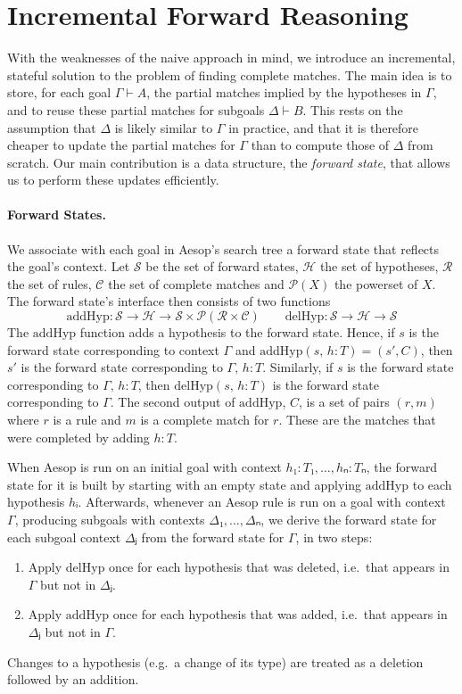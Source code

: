 \documentclass[runningheads,leqno]{llncs}
\newcommand{\para}[1]{\paragraph{\bfseries\upshape #1}}
\newcommand{\Rules}{\ensuremath{\mathcal{R}}}
\newcommand{\Hyps}{\ensuremath{\mathcal{H}}}
\newcommand{\States}{\ensuremath{\mathcal{S}}}
\newcommand{\CMatches}{\ensuremath{\mathcal{C}}}
\newcommand{\addHyp}{\ensuremath{\mathrm{addHyp}}}
\newcommand{\delHyp}{\ensuremath{\mathrm{delHyp}}}
\newcommand{\powerset}{\ensuremath{\mathcal{P}}}
\begin{document}
\section{Incremental Forward Reasoning}%
\label{sec:incremental}

With the weaknesses of the naive approach in mind, we introduce an incremental, stateful solution to the problem of finding complete matches.
The main idea is to store, for each goal $Γ ⊢ A$, the partial matches implied by the hypotheses in $Γ$, and to reuse these partial matches for subgoals $Δ ⊢ B$.
This rests on the assumption that $Δ$ is likely similar to $Γ$ in practice, and that it is therefore cheaper to update the partial matches for $Γ$ than to compute those of $Δ$ from scratch.
Our main contribution is a data structure, the \emph{forward state}, that allows us to perform these updates efficiently.

\para{Forward States.}
We associate with each goal in Aesop's search tree a forward state that reflects the goal's context.
Let $\States$ be the set of forward states, $\Hyps$ the set of hypotheses, $\Rules$ the set of rules, $\CMatches$ the set of complete matches and $\powerset(X)$ the powerset of $X$.
The forward state's interface then consists of two functions
\begin{equation*}
  \addHyp : \States → \Hyps → \States × \powerset(\Rules × \CMatches) \qquad \delHyp : \States → \Hyps → \States
\end{equation*}
The $\addHyp$ function adds a hypothesis to the forward state.
Hence, if $s$ is the forward state corresponding to context $Γ$ and $\addHyp(s,\, h : T) = (s', C)$, then $s'$ is the forward state corresponding to $Γ,\, h : T$.
Similarly, if $s$ is the forward state corresponding to $Γ,\, h : T$, then $\delHyp(s,\, h : T)$ is the forward state corresponding to $Γ$.
The second output of $\addHyp$, $C$, is a set of pairs $(r, m)$ where $r$ is a rule and $m$ is a complete match for $r$.
These are the matches that were completed by adding $h : T$.

When Aesop is run on an initial goal with context $h₁ : T₁, \dots, hₙ : Tₙ$, the forward state for it is built by starting with an empty state and applying $\addHyp$ to each hypothesis $hᵢ$.
Afterwards, whenever an Aesop rule is run on a goal with context $Γ$, producing subgoals with contexts $Δ₁, \dots, Δₙ$, we derive the forward state for each subgoal context $Δⱼ$ from the forward state for $Γ$, in two steps:
\begin{enumerate}
  \item Apply $\delHyp$ once for each hypothesis that was deleted, i.e.\ that appears in $Γ$ but not in $Δⱼ$.
  \item Apply $\addHyp$ once for each hypothesis that was added, i.e.\ that appears in $Δⱼ$ but not in $Γ$.
\end{enumerate}
Changes to a hypothesis (e.g.\ a change of its type) are treated as a deletion followed by an addition.
\end{document}
